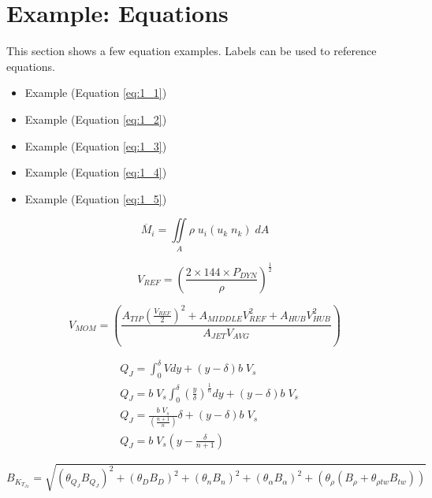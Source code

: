 \section{Example: Equations}
\label{sec12}


This section shows a few equation examples. Labels can be used to reference equations.
\begin{itemize}
	\item Example (Equation \ref{eq:1_1})
	\item Example (Equation \ref{eq:1_2})
	\item Example (Equation \ref{eq:1_3})
	\item Example (Equation \ref{eq:1_4})
	\item Example (Equation \ref{eq:1_5})
\end{itemize}

\begin{equation}
\label{eq:1_1}
\overline{M}_{i}=\iint\limits_A \rho\;u_{i}\left(u_{k}\;n_{k} \right)\;dA
\end{equation}

\begin{equation}
\label{eq:1_2}
V_{REF} = \left( \frac{2 \times 144 \times P_{DYN}}{\rho} \right)^{\frac{1}{2}}
\end{equation}

\begin{equation}
\label{eq:1_3}
V_{MOM} = \left( \frac{A_{TIP} (\frac{V_{REF}}{2})^{2} + A_{MIDDLE} V_{REF}^{2} + A_{HUB} V_{HUB}^{2}}{A_{JET} V_{AVG}} \right)
\end{equation}

\begin{equation}
\label{eq:1_4}
\begin{aligned}
& Q_{J}= \int_0^\delta Vdy+\left(y-\delta \right)b\;V_{s}\\
& Q_{J}= b\;V_{s} \int_0^\delta \left(\frac{y}{\delta} \right)^\frac{1}{n}dy+\left(y-\delta \right)b\;V_{s}\\
& Q_{J}=\frac{b\;V_{s}}{\left(\frac{n+1}{n} \right)}\delta+\left(y-\delta \right)b\;V_{s}\\
& Q_{J}=b\;V_{s}\left(y-\frac{\delta}{n+1} \right)
\end{aligned}
\end{equation}

\begin{equation}
\label{eq:1_5}
B_{K_{T_{Jx}}}=\sqrt{\left(\theta_{Q_{J}}B_{Q_{J}} \right )^{2}+\left(\theta_{D}B_{D} \right )^{2}+\left(\theta_{n}B_{n} \right )^{2}+\left(\theta_{ \alpha }B_{ \alpha } \right )^{2}+\left(\theta_{\rho}\left(B_{\rho}+\theta_{\rho tw}B_{tw} \right ) \right )}
\end{equation}
